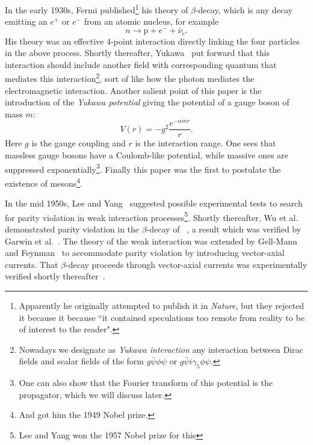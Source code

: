 In the early 1930s, Fermi published\footnote{Apparently he originally attempted
to publish it in {\it Nature}, but they rejected it because
it because ``it contained speculations too remote from reality to be of interest
to the reader".} his theory of $\beta$-decay,
 which is any decay emitting an $e^+$ or $e^-$ from
an atomic nucleus, for example
\begin{equation}
  n\to\text{p}+e^-+\bar{\nu}_e.
\end{equation}
His theory was an effective 4-point interaction directly linking the four
particles in the above process.
Shortly thereafter, Yukawa~\cite{yukawa_interaction_1935} put forward that this
interaction should include another field with corresponding quantum that
mediates this interaction\footnote{Nowadays we designate as
{\it Yukawa interaction} any interaction between
Dirac fields and scalar fields of the form
$g\bar{\psi}\phi\psi$ or $g\bar{\psi}i\gamma_5\phi\psi$.}, 
sort of like how the photon mediates the
electromagnetic interaction. Another salient point of this paper is
the introduction of the {\it Yukawa potential}
giving the potential of a gauge boson of mass $m$:
\begin{equation}
  V(r)=-g^2\frac{e^{-\alpha m r}}{r}.
\end{equation}
Here $g$ is the gauge coupling and $r$ is the interaction range. One sees that
massless gauge bosons have a Coulomb-like potential, while massive ones
are suppressed exponentially\footnote{One can also show that the Fourier
transform of this potential is the propagator, which we will discuss later.}. 
Finally this paper was the first to
postulate the existence of mesons\footnote{And got him the 1949 Nobel prize.}.

In the mid 1950s, Lee and Yang~\cite{lee_question_1956} suggested possible
experimental tests to search for parity violation in weak interaction 
processes\footnote{Lee and Yang won the 1957 Nobel prize for this}.
Shortly thereafter, Wu et al.~\cite{wu_experimental_1957} demonstrated parity
violation in the $\beta$-decay of ~\cite{wu_experimental_1957},
a result which was verified by Garwin et al.~\cite{garwin_observations_1957}. 
The theory of the weak interaction was extended by Gell-Mann and
Feynman~\cite{feynman_theory_1958} to accommodate parity violation by
introducing vector-axial currents.
That $\beta$-decay proceeds through vector-axial currents was
experimentally verified shortly thereafter~\cite{goldhaber_helicity_1958}.

